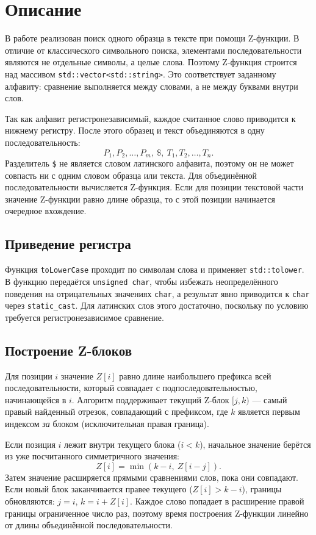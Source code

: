 \section{Описание}

В работе реализован поиск одного образца в тексте при помощи Z-функции. В отличие от классического
символьного поиска, элементами последовательности являются не отдельные символы, а целые слова.
Поэтому Z-функция строится над массивом \texttt{std::vector<std::string>}. Это соответствует заданному
алфавиту: сравнение выполняется между словами, а не между буквами внутри слов.

Так как алфавит регистронезависимый, каждое считанное слово приводится к нижнему регистру. После этого
образец и текст объединяются в одну последовательность:
\[
P_1, P_2, \ldots, P_m,\ \$,\ T_1, T_2, \ldots, T_n.
\]
Разделитель \texttt{\$} не является словом латинского алфавита, поэтому он не может совпасть ни с одним
словом образца или текста. Для объединённой последовательности вычисляется Z-функция. Если для позиции
текстовой части значение Z-функции равно длине образца, то с этой позиции начинается очередное
вхождение.

\subsection{Приведение регистра}

Функция \texttt{toLowerCase} проходит по символам слова и применяет \texttt{std::tolower}. В функцию
передаётся \texttt{unsigned char}, чтобы избежать неопределённого поведения на отрицательных значениях
\texttt{char}, а результат явно приводится к \texttt{char} через \texttt{static\_cast}. Для латинских
слов этого достаточно, поскольку по условию требуется регистронезависимое сравнение.

\subsection{Построение Z-блоков}

Для позиции \(i\) значение \(Z[i]\) равно длине наибольшего префикса всей последовательности, который
совпадает с подпоследовательностью, начинающейся в \(i\). Алгоритм поддерживает текущий Z-блок
\([j, k)\) --- самый правый найденный отрезок, совпадающий с префиксом, где \(k\) является первым
индексом \emph{за} блоком (исключительная правая граница).

Если позиция \(i\) лежит внутри текущего блока (\(i < k\)), начальное значение берётся из уже
посчитанного симметричного значения:
\[
Z[i] = \min(k - i,\ Z[i - j]).
\]
Затем значение расширяется прямыми сравнениями слов, пока они совпадают. Если новый блок заканчивается
правее текущего (\(Z[i] > k - i\)), границы обновляются: \(j = i\), \(k = i + Z[i]\). Каждое слово
попадает в расширение правой границы ограниченное число раз, поэтому время построения Z-функции
линейно от длины объединённой последовательности.

